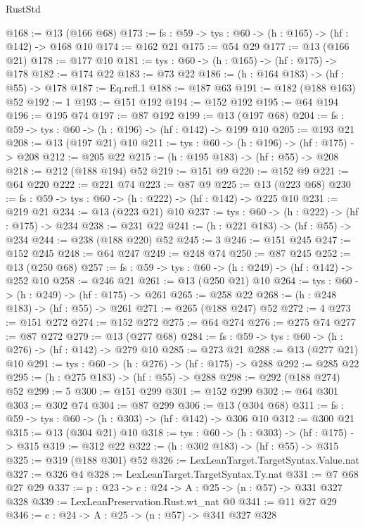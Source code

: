 \begin{lexlean}{RustStd}
\begin{coremodule}
@168 := @13 (@166 @68)
@173 := {fs : @59} -> {tys : @60} -> (h : @165) -> (hf : @142) -> @168 @10
@174 := @162 @21
@175 := @54 @29
@177 := @13 (@166 @21)
@178 := @177 @10
@181 := {tys : @60} -> (h : @165) -> (hf : @175) -> @178
@182 := @174 @22
@183 := @73 @22
@186 := (h : @164 @183) -> (hf : @55) -> @178
@187 := Eq.refl.{1}
@188 := @187 @63
@191 := @182 (@188 @163) @52
@192 := 1
@193 := @151 @192
@194 := @152 @192
@195 := @64 @194
@196 := @195 @74
@197 := @87 @192
@199 := @13 (@197 @68)
@204 := {fs : @59} -> {tys : @60} -> (h : @196) -> (hf : @142) -> @199 @10
@205 := @193 @21
@208 := @13 (@197 @21) @10
@211 := {tys : @60} -> (h : @196) -> (hf : @175) -> @208
@212 := @205 @22
@215 := (h : @195 @183) -> (hf : @55) -> @208
@218 := @212 (@188 @194) @52
@219 := @151 @9
@220 := @152 @9
@221 := @64 @220
@222 := @221 @74
@223 := @87 @9
@225 := @13 (@223 @68)
@230 := {fs : @59} -> {tys : @60} -> (h : @222) -> (hf : @142) -> @225 @10
@231 := @219 @21
@234 := @13 (@223 @21) @10
@237 := {tys : @60} -> (h : @222) -> (hf : @175) -> @234
@238 := @231 @22
@241 := (h : @221 @183) -> (hf : @55) -> @234
@244 := @238 (@188 @220) @52
@245 := 3
@246 := @151 @245
@247 := @152 @245
@248 := @64 @247
@249 := @248 @74
@250 := @87 @245
@252 := @13 (@250 @68)
@257 := {fs : @59} -> {tys : @60} -> (h : @249) -> (hf : @142) -> @252 @10
@258 := @246 @21
@261 := @13 (@250 @21) @10
@264 := {tys : @60} -> (h : @249) -> (hf : @175) -> @261
@265 := @258 @22
@268 := (h : @248 @183) -> (hf : @55) -> @261
@271 := @265 (@188 @247) @52
@272 := 4
@273 := @151 @272
@274 := @152 @272
@275 := @64 @274
@276 := @275 @74
@277 := @87 @272
@279 := @13 (@277 @68)
@284 := {fs : @59} -> {tys : @60} -> (h : @276) -> (hf : @142) -> @279 @10
@285 := @273 @21
@288 := @13 (@277 @21) @10
@291 := {tys : @60} -> (h : @276) -> (hf : @175) -> @288
@292 := @285 @22
@295 := (h : @275 @183) -> (hf : @55) -> @288
@298 := @292 (@188 @274) @52
@299 := 5
@300 := @151 @299
@301 := @152 @299
@302 := @64 @301
@303 := @302 @74
@304 := @87 @299
@306 := @13 (@304 @68)
@311 := {fs : @59} -> {tys : @60} -> (h : @303) -> (hf : @142) -> @306 @10
@312 := @300 @21
@315 := @13 (@304 @21) @10
@318 := {tys : @60} -> (h : @303) -> (hf : @175) -> @315
@319 := @312 @22
@322 := (h : @302 @183) -> (hf : @55) -> @315
@325 := @319 (@188 @301) @52
@326 := LexLeanTarget.TargetSyntax.Value.nat
@327 := @326 @4
@328 := LexLeanTarget.TargetSyntax.Ty.nat
@331 := @7 @68 @27 @29
@337 := {p : @23} -> {c : @24} -> {A : @25} -> (n : @57) -> @331 @327 @328
@339 := LexLeanPreservation.Rust.wt_nat @0
@341 := @11 @27 @29
@346 := {c : @24} -> {A : @25} -> (n : @57) -> @341 @327 @328

\end{coremodule}
\end{lexlean}
